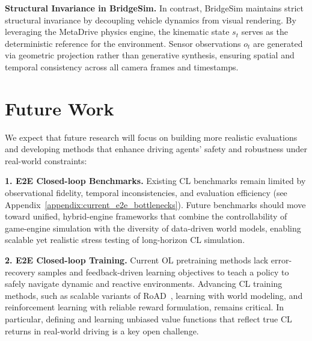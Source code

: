 \documentclass{article}
\begin{document}
\textbf{Structural Invariance in BridgeSim.} 
In contrast, BridgeSim maintains strict structural invariance by decoupling vehicle dynamics from visual rendering. By leveraging the MetaDrive physics engine, the kinematic state $s_t$ serves as the deterministic reference for the environment. Sensor observations $o_t$ are generated via geometric projection rather than generative synthesis, ensuring spatial and temporal consistency across all camera frames and timestamps.

\section{Future Work}
We expect that future research will focus on building more realistic evaluations and developing methods that enhance driving agents' safety and robustness under real-world constraints:

\textbf{1. E2E Closed-loop Benchmarks.} Existing CL benchmarks remain limited by observational fidelity, temporal inconsistencies, and evaluation efficiency (see Appendix~\ref{appendix:current_e2e_bottlenecks}). Future benchmarks should move toward unified, hybrid-engine frameworks that combine the controllability of game-engine simulation with the diversity of data-driven world models, enabling scalable yet realistic stress testing of long-horizon CL simulation.

\textbf{2. E2E Closed-loop Training.} Current OL pretraining methods lack error-recovery samples and feedback-driven learning objectives to teach a policy to safely navigate dynamic and reactive environments. Advancing CL training methods, such as scalable variants of RoAD~\cite{garcia2025road}, learning with world modeling, and reinforcement learning with reliable reward formulation, remains critical. In particular, defining and learning unbiased value functions that reflect true CL returns in real-world driving is a key open challenge.
\end{document}
